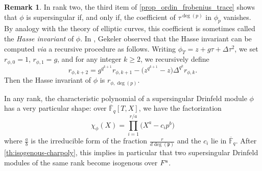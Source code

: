 \documentclass[11pt]{article}
\theoremstyle{definition}
\newtheorem{remark}[theorem]{Remark}
\newcommand\F{\mathbb{F}}
\newcommand{\p}{\mathfrak{p}}
\newcommand{\Fs}{F^{\text{\rm s}}}
\begin{document}
\begin{remark}
\label{rem:hasseinvariant}
In rank two, the third item of \cref{prop_ordin_frobenius_trace}
shows that $\phi$ is supersingular if, and only if, the coefficient of
$\tau^{\deg(p)}$ in $\phi_p$ vanishes.
By analogy with the theory of elliptic curves, this coefficient is sometimes called the \emph{Hasse invariant} of $\phi$.
In \cite[Equation~3.6 and Proposition~3.7]{gekeler_frobenius_2008}, Gekeler observed that the Hasse invariant can be computed
\emph{via} a recursive procedure as follows. Writing $\phi_T = z + g \tau + \Delta \tau^2$, we set
$r_{\phi, 0} = 1$, $r_{\phi, 1} = g$, and for any integer $k \geqslant 2$, we recursively define
\[
  r_{\phi, k+2} =   g^{q^{k+1}} r_{\phi, k+1}
                  - \big(z^{q^{k+1}} - z\big) \Delta^{q^k} r_{\phi, k}.
\]
Then the Hasse invariant of $\phi$ is $r_{\phi, \deg(p)}$.
\end{remark}

In any rank, the characteristic polynomial of a supersingular Drinfeld 
module $\phi$ has a very particular shape: over $\overline{\F}_q[T,X]$, 
we have the factorization
$$\chi_\phi(X) = \prod_{i=1}^{r/a} \big(X^a - c_i p^b\big)$$
where $\frac a b$ is the irreducible form of the fraction $\frac r {d \deg(\p)}$
and the $c_i$ lie in $\overline{\F}_q$.
After \cref{th:isogenous-charpoly}, this implies in particular
that two supersingular Drinfeld modules of the same rank become isogenous
over $\Fs$.
\end{document}

